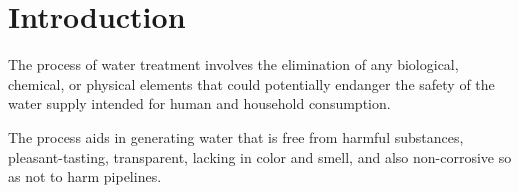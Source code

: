 \chapter{Introduction}

The process of water treatment involves the elimination of any biological,
chemical, or physical elements that could potentially endanger the safety of the
water supply intended for human and household consumption.

The process aids in generating water that is free from harmful substances,
pleasant-tasting, transparent, lacking in color and smell, and also
non-corrosive so as not to harm pipelines. \cite{TheConstructor}
